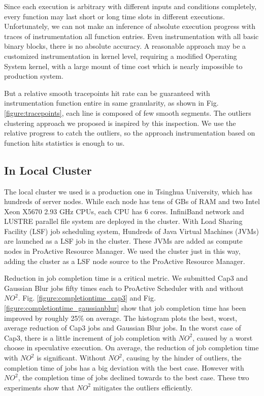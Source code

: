 Since each execution is arbitrary with different inputs and conditions completely, every
function may last short or long time slots in different executions. Unfortunately, we can
not make an inference of absolute execution progress with traces of instrumentation all
function entries. Even instrumentation with all basic binary blocks, there is no absolute
accuracy. A reasonable approach may be a customized instrumentation in kernel level,
requiring a modified Operating System kernel, with a large mount of time cost which is
nearly impossible to production system.

But a relative smooth tracepoints hit rate can be guaranteed with instrumentation function
entire in same granularity, as shown in Fig. \ref{figure:tracepoints}, each line is
composed of few smooth segments. The outliers clustering approach we proposed is inspired
by this inspection. We use the relative progress to catch the outliers, so the approach
instrumentation based on function hits statistics is enough to us.

\subsection{In Local Cluster}

The local cluster we used is a production one in Tsinghua University, which has hundreds
of  server nodes. While each node has tens of GBs of RAM and two Intel Xeon X5670 2.93 GHz
CPUs, each CPU has 6 cores. InfiniBand network and LUSTRE parallel file system are
deployed in the cluster. With Load Sharing Facility (LSF) job scheduling system, Hundreds
of Java Virtual Machines (JVMs) are launched as a LSF job in the cluster. These JVMs are
added as compute nodes in ProActive Resource Manager. We used the cluster just in this
way, adding the cluster as a LSF node source to the ProActive Resource Manager.

Reduction in job completion time is a critical metric. We submitted Cap3 and Gaussian Blur
jobs fifty times each to ProActive Scheduler with and without $NO^2$. Fig.
\ref{figure:completiontime_cap3} and Fig. \ref{figure:completiontime_gaussianblur} show
that job completion time has been improved by roughly 25\% on average. The histogram plots
the best, worst, average reduction of Cap3 jobs and Gaussian Blur jobs. In the worst case
of Cap3, there is a little increment of job completion with $NO^2$, caused by a worst
choose in speculative execution. On average, the reduction of job completion time with
$NO^2$ is significant. Without $NO^2$, causing by the hinder of outliers, the completion
time of jobs has a big deviation with the best case. However with $NO^2$, the completion
time of jobs declined towards to the best case. These two experiments show that $NO^2$
mitigates the outliers efficiently.

